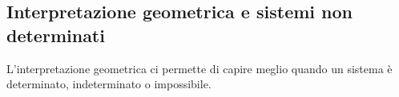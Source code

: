 % 
% 
% 
% 
% 
% 
% 
% 
%  

\subsection{Interpretazione geometrica e sistemi non determinati}
L'interpretazione geometrica ci permette di capire meglio quando un 
sistema è determinato, indeterminato o impossibile.

